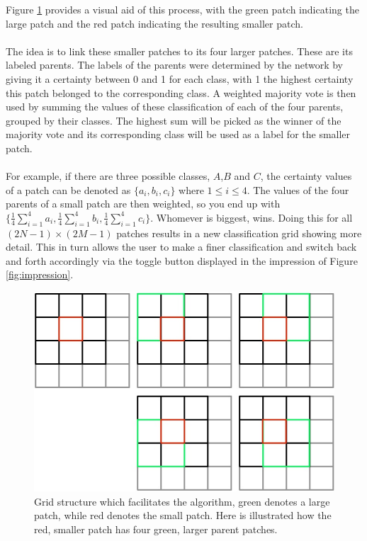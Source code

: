 \documentclass[a4paper,onecolumn]{report}
\begin{document}
Figure \ref{fig:grid} provides a visual aid of this process, with the green patch indicating the large patch and the red patch indicating the resulting smaller patch.\\
\\
The idea is to link these smaller patches to its four larger patches. These are its labeled parents. The labels of the parents were determined by the network by giving it a certainty between 0 and 1 for each class, with 1 the highest certainty this patch belonged to the corresponding class.
A weighted majority vote is then used by summing the values of these classification of each of the four parents, grouped by their classes. The highest sum will be picked as the winner of the majority vote and its corresponding class will be used as a label for the smaller patch.\\
\\
For example, if there are three possible classes, $A$,$B$ and $C$, the certainty values of a patch can be denoted as $\{a_i, b_i, c_i\}$ where $1 \leq i \leq 4$. The values of the four parents of a small patch are then weighted, so you end up with $\{ \frac{1}{4}\sum_{i=1}^{4} a_i, \frac{1}{4}\sum_{i=1}^{4} b_i, \frac{1}{4}\sum_{i=1}^{4} c_i\}$. Whomever is biggest, wins. Doing this for all $(2N - 1) \times (2M - 1)$ patches results in a new classification grid showing more detail. This in turn allows the user to make a finer classification and switch back and forth accordingly via the toggle button displayed in the impression of Figure \ref{fig:impression}.

\begin{figure}[h!]
    \centering
    \includegraphics[scale=0.6]{./images/grid_explained.jpg}
    \caption{Grid structure which facilitates the algorithm, green denotes a large patch, while red denotes the small patch. Here is illustrated how the red, smaller patch has four green, larger parent patches.}
	\label{fig:grid}
\end{figure}
\end{document}
